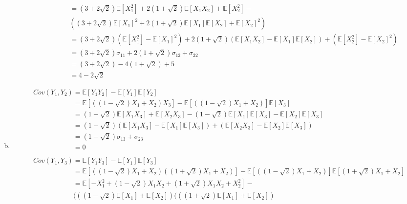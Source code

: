 \documentclass[11pt]{article}
\begin{document}
\begin{enumerate}[(a)]
\begin{align}
			&\phantom{Var(Y_1)} = (3 + 2\sqrt{2})\mathbb{E}[X_1^2] + 2(1 + \sqrt{2})\mathbb{E}[X_1X_2] + \mathbb{E}[X^2_2] - \nonumber\\
			&\phantom{Var(Y_1)} ((3 + 2\sqrt{2})\mathbb{E}[X_1]^2 + 2(1 + \sqrt{2})\mathbb{E}[X_1]\mathbb{E}[X_2] + \mathbb{E}[X_2]^2)\nonumber\\
			&\phantom{Var(Y_1)} = (3 + 2\sqrt{2})(\mathbb{E}[X^2_1] - \mathbb{E}[X_1]^2) + 2(1 + \sqrt{2})(\mathbb{E}[X_1X_2] - \mathbb{E}[X_1]\mathbb{E}[X_2]) + (\mathbb{E}[X^2_2] - \mathbb{E}[X_2]^2)\nonumber\\
			&\phantom{Var(Y_1)} = (3 + 2\sqrt{2})\sigma_{11} + 2(1 + \sqrt{2})\sigma_{12} + \sigma_{22}\nonumber\\
			&\phantom{Var(Y_1)} = (3 + 2\sqrt{2}) - 4(1 + \sqrt{2}) + 5\nonumber\\
			&\phantom{Var(Y_1)} = 4 - 2\sqrt{2}\nonumber
		\end{align}
		\item
		\begin{align}
			&Cov(Y_1, Y_2) = \mathbb{E}[Y_1Y_2] - \mathbb{E}[Y_1]\mathbb{E}[Y_2]\nonumber\\
			&\phantom{Cov(Y_1, Y_2)} = \mathbb{E}[((1 - \sqrt{2})X_1 + X_2)X_3] - \mathbb{E}[((1 - \sqrt{2})X_1 + X_2)]\mathbb{E}[X_3]\nonumber\\
			&\phantom{Cov(Y_1, Y_2)} = (1 - \sqrt{2})\mathbb{E}[X_1X_3] + \mathbb{E}[X_2X_3] - (1 - \sqrt{2})\mathbb{E}[X_1]\mathbb{E}[X_3] - \mathbb{E}[X_2]\mathbb{E}[X_3]\nonumber\\
			&\phantom{Cov(Y_1, Y_2)} = (1 - \sqrt{2})(\mathbb{E}[X_1X_3] - \mathbb{E}[X_1]\mathbb{E}[X_3]) + (\mathbb{E}[X_2X_3] - \mathbb{E}[X_2]\mathbb{E}[X_3])\nonumber\\
			&\phantom{Cov(Y_1, Y_2)} = (1 - \sqrt{2})\sigma_{13} + \sigma_{23}\nonumber\\
			&\phantom{Cov(Y_1, Y_2)} = 0\nonumber\\
			&\nonumber\\
			&Cov(Y_1, Y_3) = \mathbb{E}[Y_1Y_3] - \mathbb{E}[Y_1]\mathbb{E}[Y_3]\nonumber\\
			&\phantom{Cov(Y_1, Y_3)} = \mathbb{E}[((1 - \sqrt{2})X_1 + X_2)((1 + \sqrt{2})X_1 + X_2)] - \mathbb{E}[((1 - \sqrt{2})X_1 + X_2)]\mathbb{E}[(1 + \sqrt{2})X_1 + X_2]\nonumber\\
			&\phantom{Cov(Y_1, Y_3)} = \mathbb{E}[-X^2_1 + (1 - \sqrt{2})X_1X_2 + (1 + \sqrt{2})X_1X_2 + X^2_2] - \nonumber\\
			&\phantom{Cov(Y_1, Y_3)}	(((1 - \sqrt{2})\mathbb{E}[X_1] + \mathbb{E}[X_2])(((1 + \sqrt{2})\mathbb{E}[X_1] + \mathbb{E}[X_2])\nonumber\\

\end{align}
\end{enumerate}
\end{document}
